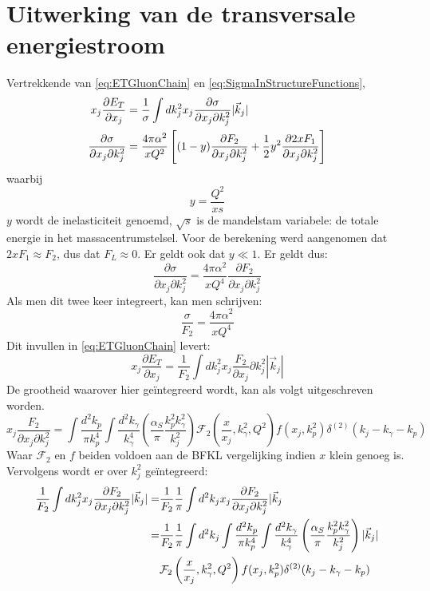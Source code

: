 \documentclass[a4paper,11pt]{article}
\numberwithin{equation}{section} %
\begin{document}
\section{Uitwerking van de transversale energiestroom} \label{app:ET}
Vertrekkende van \eqref{eq:ETGluonChain} en \eqref{eq:SigmaInStructureFunctions},
\begin{align}
x_j \frac{\partial E_T}{\partial x_j} &= \frac{1}{\sigma} \int dk_j^2 x_j \frac{\partial \sigma}{\partial x_j \partial k_j^2} |\vec{k}_j|\notag \\
\frac{\partial \sigma}{\partial x_j \partial k_j^2} &= \frac{4 \pi \alpha^2}{xQ^2} \left[ (1-y) \frac{\partial F_2}{\partial x_j \partial k_j^2} + \frac{1}{2} y^2 \frac{\partial 2xF_1}{\partial x_j \partial k_j^2} \right] \notag
\end{align}
waarbij
\begin{equation}
y = \frac{Q^2}{xs}
\end{equation}
$y$ wordt de inelasticiteit genoemd, $\sqrt{s}$ is de mandelstam variabele: de totale energie in het massacentrumstelsel.
Voor de berekening werd aangenomen dat $2xF_1 \approx F_2$, dus dat $F_L \approx 0$.
Er geldt ook dat $y \ll 1$.
Er geldt dus:
\begin{equation}
\frac{\partial \sigma}{\partial x_j \partial k_j^2} = \frac{4\pi \alpha^2}{xQ^4} \frac{\partial F_2}{\partial x_j \partial k_j^2}
\end{equation}
Als men dit twee keer integreert, kan men schrijven:
\begin{equation}
\frac{\sigma}{F_2} = \frac{4\pi \alpha^2}{xQ^4}
\end{equation}
Dit invullen in \eqref{eq:ETGluonChain} levert:
\begin{equation}
x_j \frac{\partial E_T}{\partial x_j} = \frac{1}{F_2} \int dk_j^2 x_j \frac{F_2}{\partial x_j}{\partial k_j^2} |\vec{k}_j|
\end{equation}
De grootheid waarover hier geïntegreerd wordt, kan als volgt uitgeschreven worden.
\begin{equation}
x_j \frac{F_2}{\partial x_j \partial k_j^2} = \int \frac{d^2 k_p}{\pi k_p^4} \int \frac{d^2 k_\gamma}{k_\gamma^4} \left( \frac{\alpha_S}{\pi} \frac{k_p^2 k_\gamma^2}{k_j^2} \right) \mathcal{F}_2 \left( \frac{x}{x_j}, k_\gamma^2,Q^2 \right) f(x_j,k_p^2) \delta^{(2)}(k_j-k_\gamma-k_p)
\end{equation}
Waar $\mathcal{F}_2$ en $f$ beiden voldoen aan de BFKL vergelijking indien $x$ klein genoeg is.
Vervolgens wordt er over $k_j^2$ geïntegreerd:
\begin{align}
\frac{1}{F_2} \int dk_j^2 x_j \frac{\partial F_2}{\partial x_j \partial k_j^2} |\vec{k}_j| =& \frac{1}{F_2} \frac{1}{\pi} \int d^2 k_j x_j \frac{\partial F_2}{\partial x_j \partial k_j^2} |\vec{k}_j \notag \\
=& \frac{1}{F_2} \frac{1}{\pi} \int d^2 k_j \int \frac{d^2 k_p}{\pi k_p^4} \int \frac{d^2 k_\gamma}{k_\gamma^4} \left( \frac{\alpha_S}{\pi} \frac{k_p^2 k_\gamma^2}{k_j^2}  \right) |\vec{k}_j| \notag \\
&\mathcal{F}_2 \left( \frac{x}{x_j}, k_\gamma^2, Q^2 \right) f(x_j,k_p^2) \delta^{(2)}(k_j-k_\gamma-k_p)
\end{align}
\end{document}
